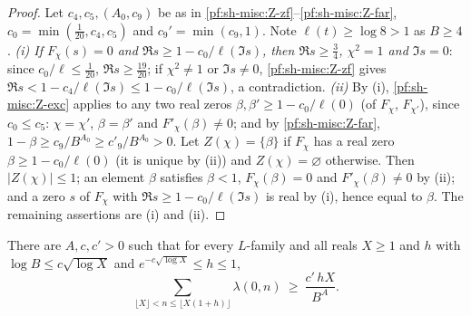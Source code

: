 \begin{proof}
Let $c_4,c_5,(A_0,c_9)$ be as in \ref{pf:sh-misc:Z-zf}--\ref{pf:sh-misc:Z-far}, $c_0=\min(\frac1{20},c_4,c_5)$ and $c_9'=\min(c_9,1)$. Note
$\ell(t)\ge\log8>1$ as $B\ge4$. \emph{(i) If $F_\chi(s)=0$ and $\Re s\ge1-c_0/\ell(\Im s)$, then $\Re s\ge\frac34$, $\chi^2=1$ and $\Im s=0$}: since
$c_0/\ell\le\frac1{20}$, $\Re s\ge\frac{19}{20}$; if $\chi^2\ne1$ or $\Im s\ne0$, \ref{pf:sh-misc:Z-zf} gives $\Re s<1-c_4/\ell(\Im s)\le1-c_0/\ell(\Im s)$, a
contradiction. \emph{(ii)} By (i), \ref{pf:sh-misc:Z-exc} applies to any two real zeros $\beta,\beta'\ge1-c_0/\ell(0)$ (of $F_\chi$, $F_{\chi'}$),
since $c_0\le c_5$: $\chi=\chi'$, $\beta=\beta'$ and $F'_\chi(\beta)\ne0$; and by \ref{pf:sh-misc:Z-far}, $1-\beta\ge c_9/B^{A_0}\ge c'_9/B^{A_0}>0$.
Let $Z(\chi)=\{\beta\}$ if $F_\chi$ has a real zero $\beta\ge1-c_0/\ell(0)$ (it is unique by (ii)) and $Z(\chi)=\varnothing$ otherwise. Then $|Z(\chi)|\le1$;
an element $\beta$ satisfies $\beta<1$, $F_\chi(\beta)=0$ and $F'_\chi(\beta)\ne0$ by (ii); and a zero $s$ of $F_\chi$ with $\Re s\ge1-c_0/\ell(\Im s)$ is real by
(i), hence equal to $\beta$. The remaining assertions are (i) and (ii).
\end{proof}

\begin{theorem}\label{pf:sh-misc:thmA}
There are $A,c,c'>0$ such that for every $L$-family and all reals $X\ge1$ and $h$ with $\log B\le c\sqrt{\log X}$ and
$e^{-c\sqrt{\log X}}\le h\le1$,
\[
\sum_{\lfloor X\rfloor<n\le\lfloor X(1+h)\rfloor}\lambda(0,n)\ \ge\ \frac{c'\,hX}{B^A}.
\]
\end{theorem}

